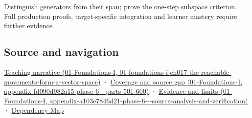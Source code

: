 Distinguish generators from their span; prove the one-step subspace criterion. Full production proofs, target-specific integration and learner mastery require further evidence.

\subsection{Source and navigation}\label{appendix-173b52c063ae-source-and-navigation}

\href{../01-Foundations-I/main.pdf\#nameddest=01-foundations-i-ch017-the-reachable-movements-form-a-vector-space}{Teaching narrative (01-Foundations-I, 01-foundations-i-ch017-the-reachable-movements-form-a-vector-space)} · \href{../01-Foundations-I/main.pdf\#nameddest=appendix-fd090d982a15-phase-6---parts-501-600}{Coverage and source gap (01-Foundations-I, appendix-fd090d982a15-phase-6-\/-\/-parts-501-600)} · \href{../01-Foundations-I/main.pdf\#nameddest=appendix-a103e7846d21-phase-6---source-analysis-and-verification}{Evidence and limits (01-Foundations-I, appendix-a103e7846d21-phase-6-\/-\/-source-analysis-and-verification)} · \hyperref[appendix-4ad47bdd269a]{Dependency Map}
